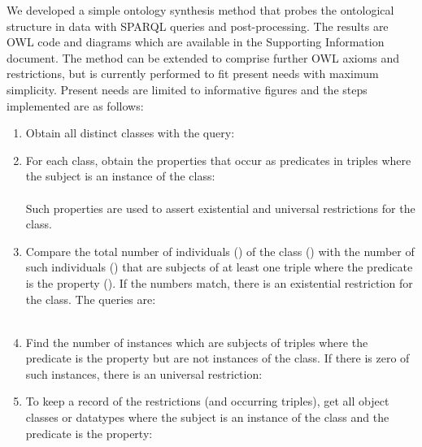 We developed a simple ontology synthesis method that probes
the ontological structure in data with
SPARQL queries and post-processing.
The results are OWL code and diagrams which are available in the
Supporting Information document.
The method can be extended to comprise further OWL axioms and restrictions,
but is currently performed to fit present needs with maximum simplicity.
Present needs are limited to informative figures and
the steps implemented are as follows:
\begin{enumerate}[leftmargin=0cm]
	\item Obtain all distinct classes with the query:\\
	\item For each class, obtain the properties that occur as predicates in triples where the subject is an instance of the class:\\
		\\
					Such properties are used to assert existential and universal restrictions for the class.
				\item Compare the total number of individuals () of the class () with
					the number of such individuals () that are subjects of at least one triple where 
							the predicate is the property ().
								If the numbers match, there is an existential restriction for the class. The queries are:\\
									\\
										\item Find the number of instances which are subjects of triples where the predicate is the property but are not instances of the class.
											If there is zero of such instances, there is an universal restriction:\\
													\item To keep a record of the restrictions (and occurring triples), get all object classes or datatypes where the subject is an instance of the class and the predicate is the property:\\

\end{enumerate}
